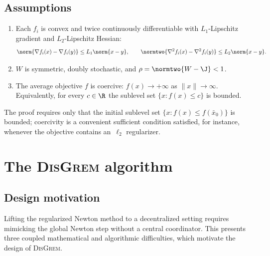 \documentclass[review,onefignum,onetabnum]{siamart171218}
\begin{document}
	\subsection{Assumptions}
	\begin{assumption}\label{ass:standing}
		\begin{enumerate}[nosep,leftmargin=1em]
			\item Each $f_i$ is convex and twice continuously differentiable
			with $L_1$-Lipschitz gradient and $L_2$-Lipschitz Hessian:
			\[
			\norm{\nabla f_i(x)-\nabla f_i(y)}\le L_1\norm{x-y},
			\qquad
			\normtwo{\nabla^2 f_i(x)-\nabla^2 f_i(y)}\le L_2\norm{x-y}.
			\]
			\item $W$ is symmetric, doubly stochastic, and $\rho=\normtwo{W-\J}<1$.
			\item The average objective $f$ is coercive: $f(x)\to+\infty$ as $\|x\|\to\infty$.
			Equivalently, for every $c\in\R$ the sublevel set $\{x:f(x)\le c\}$ is bounded.
		\end{enumerate}
	\end{assumption}
	
	\begin{remark}
		The proof requires only that the initial sublevel set
		$\{x : f(x) \le f(\bar x_0)\}$ is bounded;
		coercivity is a convenient sufficient condition satisfied,
		for instance, whenever the objective contains an~$\ell_2$
		regularizer.
	\end{remark}
	
	
	\section{The \textsc{DisGrem} algorithm}\label{sec:alg}
	
	\subsection{Design motivation}\label{ssec:design}
	
	Lifting the regularized Newton method to a decentralized setting
	requires mimicking the global Newton step without a central
	coordinator.
	This presents three coupled mathematical and algorithmic
	difficulties, which motivate the design of \textsc{DisGrem}.
	
\end{document}
